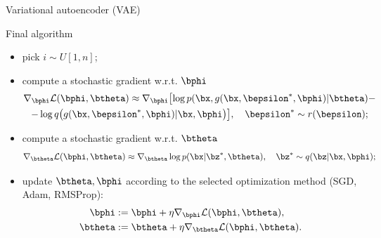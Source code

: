 \begin{frame}{Variational autoencoder (VAE)}
	\begin{block}{Final algorithm}
		\begin{itemize}
			\item pick $i \sim U[1, n]$;
			\item compute a stochastic gradient w.r.t. $\bphi$
			\begin{multline*}
				\nabla_{\bphi} \mathcal{L} (\bphi, \btheta) \approx \nabla_{\bphi} \bigl[\log p(\bx, g(\bx, \bepsilon^*, \bphi) | \btheta)  - \\ - \log q\bigl(g(\bx, \bepsilon^*, \bphi) | \bx, \bphi \bigr)\bigr], \quad \bepsilon^* \sim r(\bepsilon);
			\end{multline*}
			\item compute a stochastic gradient w.r.t. $\btheta$
			\[
			\nabla_{\btheta} \mathcal{L} (\bphi, \btheta) \approx \nabla_{\btheta} \log p(\bx|\bz^*, \btheta), \quad \bz^* \sim q(\bz|\bx, \bphi);
			\]
			\item update $\btheta, \bphi$ according to the selected optimization method (SGD, Adam, RMSProp):
			\begin{align*}
				\bphi &:= \bphi + \eta \nabla_{\bphi} \mathcal{L}(\bphi, \btheta), \\
				\btheta &:= \btheta + \eta \nabla_{\btheta} \mathcal{L}(\bphi, \btheta).
			\end{align*}
		\end{itemize}
	\end{block}
\end{frame}
